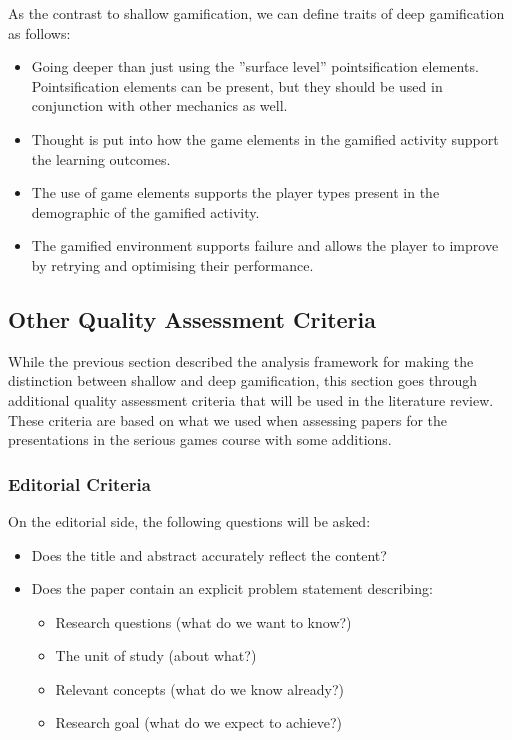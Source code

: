 As the contrast to shallow gamification, we can define traits of deep gamification as follows:
\begin{itemize}
    \item Going deeper than just using the ''surface level'' pointsification elements. Pointsification elements can be present, but they should be used in conjunction with other mechanics as well. 
    \item Thought is put into how the game elements in the gamified activity support the learning outcomes.
    \item The use of game elements supports the player types present in the demographic of the gamified activity.
    \item The gamified environment supports failure and allows the player to improve by retrying and optimising their performance. 
\end{itemize}


\subsection{Other Quality Assessment Criteria}
While the previous section described the analysis framework for making the distinction between shallow and deep gamification, this section goes through additional quality assessment criteria that will be used in the literature review. These criteria are based on what we used when assessing papers for the presentations in the serious games course with some additions. 

\subsubsection{Editorial Criteria}
On the editorial side, the following questions will be asked:
\begin{itemize}
    \item Does the title and abstract accurately reflect the content?
    \item Does the paper contain an explicit problem statement describing:
    \begin{itemize}
        \item Research questions (what do we want to know?)
        \item The unit of study (about what?)
        \item Relevant concepts (what do we know already?)
        \item Research goal (what do we expect to achieve?)
    \end{itemize}
\end{itemize}

